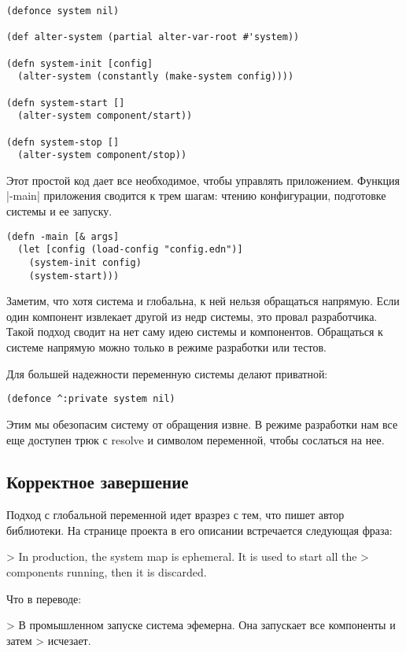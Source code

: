 \begin{verbatim}
(defonce system nil)

(def alter-system (partial alter-var-root #'system))

(defn system-init [config]
  (alter-system (constantly (make-system config))))

(defn system-start []
  (alter-system component/start))

(defn system-stop []
  (alter-system component/stop))
\end{verbatim}

Этот простой код дает все необходимое, чтобы управлять приложением. Функция
\spverb|-main| приложения сводится к трем шагам: чтению конфигурации, подготовке
системы и ее запуску.

\begin{verbatim}
(defn -main [& args]
  (let [config (load-config "config.edn")]
    (system-init config)
    (system-start)))
\end{verbatim}

Заметим, что хотя система и глобальна, к ней нельзя обращаться напрямую. Если
один компонент извлекает другой из недр системы, это провал разработчика. Такой
подход сводит на нет саму идею системы и компонентов. Обращаться к системе
напрямую можно только в режиме разработки или тестов.

Для большей надежности переменную системы делают приватной:

\begin{verbatim}
(defonce ^:private system nil)
\end{verbatim}

Этим мы обезопасим систему от обращения извне. В режиме разработки нам все еще
доступен трюк с resolve и символом переменной, чтобы сослаться на нее.

\subsection{Корректное завершение}

Подход с глобальной переменной идет вразрез с тем, что пишет автор
библиотеки. На странице проекта в его описании встречается следующая фраза:

> In production, the system map is ephemeral. It is used to start all the
> components running, then it is discarded.

Что в переводе:

> В промышленном запуске система эфемерна. Она запускает все компоненты и затем
> исчезает.

